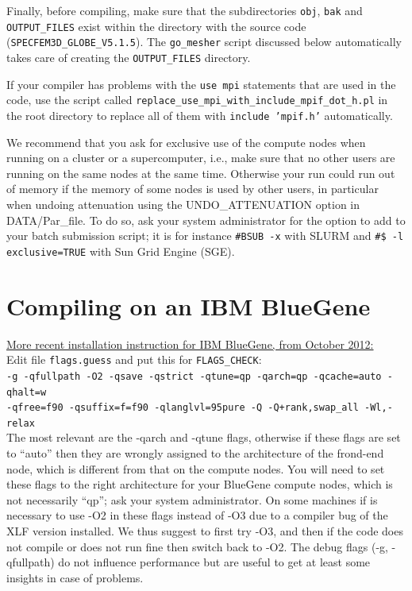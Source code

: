 \documentclass[oneside,english]{book}
\begin{document}
Finally, before compiling, make sure that the subdirectories \texttt{obj},
\texttt{bak} and \texttt{OUTPUT\_FILES} exist within the directory
with the source code (\texttt{SPECFEM3D\_GLOBE\_V5.1.5}). The \texttt{go\_mesher}
script discussed below automatically takes care of creating the \texttt{OUTPUT\_FILES} directory.

If your compiler has problems with the \texttt{use mpi} statements that are used in the code, use the script called
\texttt{replace\_use\_mpi\_with\_include\_mpif\_dot\_h.pl} in the root directory to replace all of them with \texttt{include 'mpif.h'} automatically.

We recommend that you ask for exclusive use of the compute nodes when running on a cluster or a supercomputer, i.e., make sure that no other users
are running on the same nodes at the same time. Otherwise your run could run out of memory if the memory of some nodes is used by other users, in particular
when undoing attenuation using the UNDO\_ATTENUATION option in DATA/Par\_file.
To do so, ask your system administrator for the option to add to your batch submission script; it is for instance 
\texttt{\#BSUB -x} with SLURM and \texttt{\#\$ -l exclusive=TRUE} with Sun Grid Engine (SGE).

\section{Compiling on an IBM BlueGene}

\underline{More recent installation instruction for IBM BlueGene, from October 2012:}\\

\noindent
Edit file \texttt{flags.guess} and put this for \texttt{FLAGS\_CHECK}:\\

\noindent
\texttt{-g -qfullpath -O2 -qsave -qstrict -qtune=qp -qarch=qp -qcache=auto -qhalt=w}\\
\noindent
\texttt{-qfree=f90 -qsuffix=f=f90 -qlanglvl=95pure -Q -Q+rank,swap\_all -Wl,-relax}\\

\noindent
The most relevant are the -qarch and -qtune flags, otherwise if these flags are set to ``auto'' then they are wrongly assigned to
the architecture of the frond-end node, which is different from that on the compute nodes.
You will need to set these flags to the right architecture for your BlueGene compute nodes, which is not necessarily ``qp'';
ask your system administrator.
On some machines if is necessary to use -O2 in these flags instead of -O3 due to a compiler bug of the XLF version installed.
We thus suggest to first try -O3, and then if the code does not compile or does not run fine then switch back to -O2.
The debug flags (-g, -qfullpath) do not influence performance but are useful to get at least some insights in case of problems.\\
\end{document}
